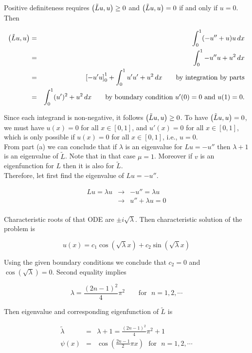 {\begin{solution}
\begin{enumerate}
Positive definiteness requires $\left( \tilde{L}u, u \right) \geq 0$ and $\left( \tilde{L}u, u \right) = 0$ if and only if $u=0$. Then

\begin{eqnarray*}
\left( \tilde{L}u, u \right) &=&  \int_0^1 (-u'' + u) u  \, dx \\
								 &=& \int_0^1 - u'' u + u^2 \, dx  \\
								 &=& \left[ -u' u\right]_0^1 + \int_0^1  u' u' + u^2 \, dx   \qquad \mbox{by integration by parts}\\
								 &=&\int_0^1  (u')^2 + u^2 \, dx   \qquad \mbox{by boundary condition $u'(0)=0$ and $u(1)=0$}.\\
\end{eqnarray*}

Since each integrand is non-negative, it follows 
$\left( \tilde{L}u, u \right) \geq 0 $. To have $\left( \tilde{L}u, u \right) = 0$, we must have $u(x) = 0$ for all $x \in [0, 1]$, and
$ u'(x)= 0 $ for all $x \in [0, 1]$, which is only possible if $u(x) = 0$ for all $x \in [0, 1]$, i.e., $u = 0$.\\

From part (a) we can conclude that if $\lambda$ is an eigenvalue for $Lu = -u''$ then $\lambda + 1 $ is an eigenvalue of $\tilde{L}$. Note that in that case $\mu = 1$. Moreover if $v$ is an eigenfunction for $L$ then it is also for $\tilde{L}$.\\

Therefore, let first  find the eigenvalue of $Lu = - u''$. 

\begin{eqnarray*}
 Lu = \lambda u  &\rightarrow& -u'' = \lambda u \\
 							 	 &\rightarrow& u''+ \lambda u = 0 \\
\end{eqnarray*}

Characteristic roots of that ODE are $ \pm i \sqrt{\lambda} $. Then characteristic solution of the problem is 

\[
u(x)= c_1 \cos(\sqrt{\lambda} x) + c_2  \sin(\sqrt{\lambda} x)
\]

Using the given boundary conditions we conclude that $ c_2 = 0$ and $ \cos(\sqrt{\lambda}) = 0$. Second equality implies 

\[
 \lambda = \frac{(2n-1)^2}{4} \pi^2 \qquad \mbox{for}\:\:\:  n=1,2,\cdots
\]

Then eigenvalue and corresponding eigenfunction of $\tilde{L}$ is 


\begin{eqnarray*}
 								\tilde{\lambda} &=&	\lambda + 1 = \frac{(2n-1)^2}{4} \pi^2 + 1 \\
 								       \psi(x) &=& \cos(\frac{2n-1}{2}\pi x ) \:\:\: \mbox{for} \:\:\: n=1, 2, \cdots							 	  
\end{eqnarray*} 


\end{enumerate}
\end{solution}}
